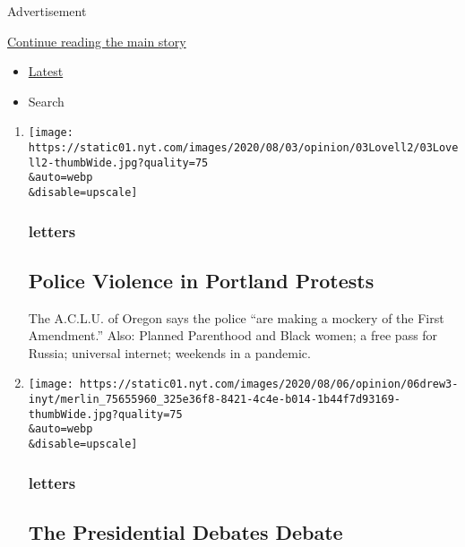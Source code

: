 Advertisement

\protect\hyperlink{after-mid1}{Continue reading the main story}

\begin{itemize}
\tightlist
\item
  \protect\hyperlink{stream-panel}{Latest}
\item
  Search
\end{itemize}

\begin{enumerate}
\def\labelenumi{\arabic{enumi}.}
\item
  \href{/2020/08/07/opinion/letters/portland-police.html}{}

  \texttt{[image: https://static01.nyt.com/images/2020/08/03/opinion/03Lovell2/03Lovell2-thumbWide.jpg?quality=75\\\&auto=webp\\\&disable=upscale]}

  \hypertarget{letters}{%
  \subsubsection{letters}\label{letters}}

  \hypertarget{police-violence-in-portland-protests}{%
  \subsection{Police Violence in Portland
  Protests}\label{police-violence-in-portland-protests}}

  The A.C.L.U. of Oregon says the police ``are making a mockery of the
  First Amendment.'' Also: Planned Parenthood and Black women; a free
  pass for Russia; universal internet; weekends in a pandemic.
\item
  \href{/2020/08/07/opinion/letters/presidential-debates.html}{}

  \texttt{[image: https://static01.nyt.com/images/2020/08/06/opinion/06drew3-inyt/merlin\_75655960\_325e36f8-8421-4c4e-b014-1b44f7d93169-thumbWide.jpg?quality=75\\\&auto=webp\\\&disable=upscale]}

  \hypertarget{letters-1}{%
  \subsubsection{letters}\label{letters-1}}

  \hypertarget{the-presidential-debates-debate}{%
  \subsection{The Presidential Debates
  Debate}\label{the-presidential-debates-debate}}


\end{enumerate}
